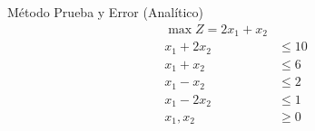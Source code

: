 \begin{frameExample}{Método Prueba y Error (Analítico)}{}
    \begin{align*}
    \max Z = 2x_1 + x_2 & \\[5mm]
    x_1 + 2x_2 & \leq 10\\
    x_1 + x_2 & \leq 6\\
    x_1 - x_2 & \leq 2\\
    x_1 - 2x_2 & \leq 1\\[5mm]
    x_1, x_2 & \geq 0
  \end{align*}
\end{frameExample}

